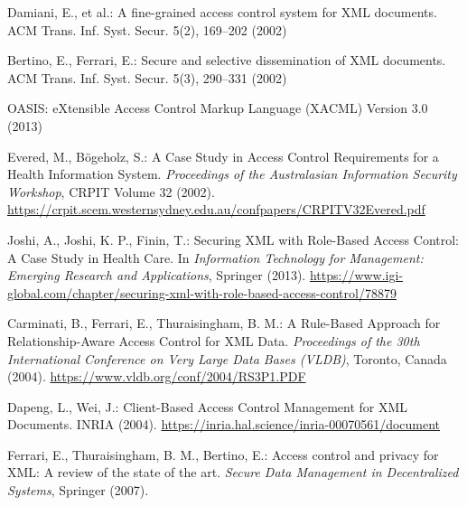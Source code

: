\documentclass[runningheads]{llncs}
\begin{document}
\begin{thebibliography}{9}

    Damiani, E., et al.: A fine-grained access control system for XML documents. ACM Trans. Inf. Syst. Secur. 5(2), 169--202 (2002)
    
    Bertino, E., Ferrari, E.: Secure and selective dissemination of XML documents. ACM Trans. Inf. Syst. Secur. 5(3), 290--331 (2002)
    
    OASIS: eXtensible Access Control Markup Language (XACML) Version 3.0 (2013)
    
    Evered, M., Bögeholz, S.: A Case Study in Access Control Requirements for a Health Information System. \textit{Proceedings of the Australasian Information Security Workshop}, CRPIT Volume 32 (2002). \url{https://crpit.scem.westernsydney.edu.au/confpapers/CRPITV32Evered.pdf}
    
    Joshi, A., Joshi, K. P., Finin, T.: Securing XML with Role-Based Access Control: A Case Study in Health Care. In \textit{Information Technology for Management: Emerging Research and Applications}, Springer (2013). \url{https://www.igi-global.com/chapter/securing-xml-with-role-based-access-control/78879}
    
    Carminati, B., Ferrari, E., Thuraisingham, B. M.: A Rule-Based Approach for Relationship-Aware Access Control for XML Data. \textit{Proceedings of the 30th International Conference on Very Large Data Bases (VLDB)}, Toronto, Canada (2004). \url{https://www.vldb.org/conf/2004/RS3P1.PDF}
    
    Dapeng, L., Wei, J.: Client-Based Access Control Management for XML Documents. INRIA (2004). \url{https://inria.hal.science/inria-00070561/document}
    
    Ferrari, E., Thuraisingham, B. M., Bertino, E.: Access control and privacy for XML: A review of the state of the art. \textit{Secure Data Management in Decentralized Systems}, Springer (2007). 
    
    \end{thebibliography}
    
\end{document}
